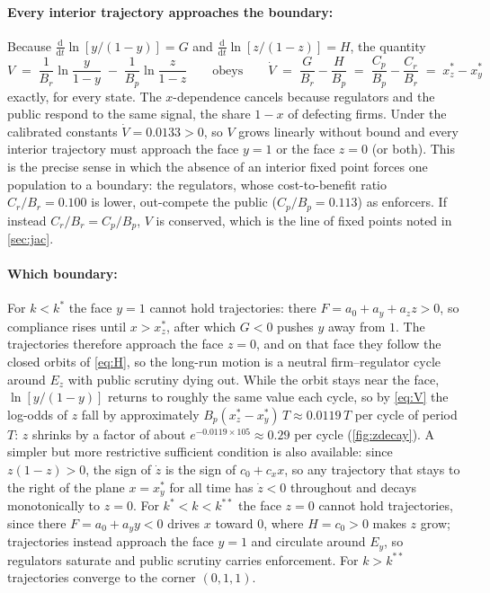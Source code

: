 \documentclass[10pt]{article}
\begin{document}
\paragraph{Every interior trajectory approaches the boundary:} Because $\tfrac{\mathrm{d}}{\mathrm{d}t}\ln[y/(1-y)]=G$ and $\tfrac{\mathrm{d}}{\mathrm{d}t}\ln[z/(1-z)]=H$, the quantity
\begin{equation}
V \;=\; \frac{1}{B_r}\ln\frac{y}{1-y} \;-\; \frac{1}{B_p}\ln\frac{z}{1-z}
\qquad\text{obeys}\qquad
\dot V \;=\; \frac{G}{B_r}-\frac{H}{B_p} \;=\; \frac{C_p}{B_p}-\frac{C_r}{B_r} \;=\; x_z^*-x_y^*
\label{eq:V}
\end{equation}
exactly, for every state. The $x$-dependence cancels because regulators and the public respond to the same signal, the share $1-x$ of defecting firms. Under the calibrated constants $\dot V=0.0133>0$, so $V$ grows linearly without bound and every interior trajectory must approach the face $y=1$ or the face $z=0$ (or both). This is the precise sense in which the absence of an interior fixed point forces one population to a boundary: the regulators, whose cost-to-benefit ratio $C_r/B_r=0.100$ is lower, out-compete the public ($C_p/B_p=0.113$) as enforcers. If instead $C_r/B_r=C_p/B_p$, $V$ is conserved, which is the line of fixed points noted in \cref{sec:jac}.

\paragraph{Which boundary:} For $k<k^*$ the face $y=1$ cannot hold trajectories: there $F=a_0+a_y+a_z z>0$, so compliance rises until $x>x_z^*$, after which $G<0$ pushes $y$ away from $1$. The trajectories therefore approach the face $z=0$, and on that face they follow the closed orbits of \cref{eq:H}, so the long-run motion is a neutral firm--regulator cycle around $E_z$ with public scrutiny dying out. While the orbit stays near the face, $\ln[y/(1-y)]$ returns to roughly the same value each cycle, so by \cref{eq:V} the log-odds of $z$ fall by approximately $B_p(x_z^*-x_y^*)\,T\approx0.0119\,T$ per cycle of period $T$: $z$ shrinks by a factor of about $e^{-0.0119\times105}\approx0.29$ per cycle (\cref{fig:zdecay}). A simpler but more restrictive sufficient condition is also available: since $z(1-z)>0$, the sign of $\dot z$ is the sign of $c_0+c_x x$, so any trajectory that stays to the right of the plane $x=x_y^*$ for all time has $\dot z<0$ throughout and decays monotonically to $z=0$. For $k^*<k<k^{**}$ the face $z=0$ cannot hold trajectories, since there $F=a_0+a_y y<0$ drives $x$ toward $0$, where $H=c_0>0$ makes $z$ grow; trajectories instead approach the face $y=1$ and circulate around $E_y$, so regulators saturate and public scrutiny carries enforcement. For $k>k^{**}$ trajectories converge to the corner $(0,1,1)$.
\end{document}
